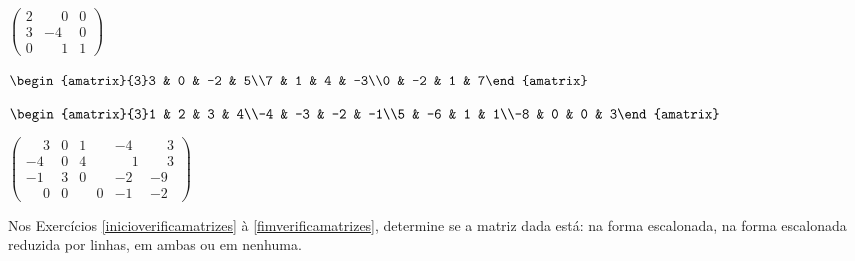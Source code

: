 \documentclass[12pt]{exam}
\begin{document}
\begin{exercicio}
    $\begin{pmatrix}2 & \phantom{-} 0 & 0\\3 & -4 &0\\0 & \phantom{-} 1 & 1\end{pmatrix}$
\end{exercicio}

\begin{exercicio}
    $\begin{amatrix}{3}3 & 0 & -2 & 5\\7 & 1 & 4 & -3\\0 & -2 & 1 & 7\end{amatrix}$
\end{exercicio}

\begin{exercicio}
    $\begin{amatrix}{3}1 & 2 & 3 & 4\\-4 & -3 & -2 & -1\\5 & -6 & 1 & 1\\-8 & 0 & 0 & 3\end{amatrix}$
\end{exercicio}

\begin{exercicio}\label{fimencontrarsistema}
    $\begin{pmatrix}\phantom{-} 3 & 0 & 1 & -4 & \phantom{-} 3\\-4 & 0 & 4 & \phantom{-} 1 & \phantom{-} 3\\-1 & 3 & 0 & -2 & -9\\\phantom{-} 0 & 0 & \phantom{-} 0 & -1 & -2\end{pmatrix}$
\end{exercicio}

Nos Exercícios \ref{inicioverificamatrizes} à \ref{fimverificamatrizes}, determine se a matriz dada está: na forma escalonada, na forma escalonada reduzida por linhas, em ambas ou em nenhuma.
\end{document}
